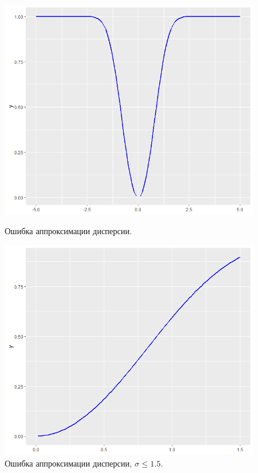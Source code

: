\documentclass[12pt]{article}
\begin{document}
\begin{figure}[h]
	\begin{center}
		\begin{minipage}[h]{0.4\linewidth}
			\includegraphics[width=1\linewidth]{ris3.png}
			\caption{Ошибка аппроксимации дисперсии.} %
			\label{ris3} %
		\end{minipage}
		\hfill
		\begin{minipage}[h]{0.4\linewidth}
			\includegraphics[width=1\linewidth]{ris4.png}
			\caption{Ошибка аппроксимации дисперсии, $\sigma\leq 1.5.$}
			\label{ris4}
		\end{minipage}
	\end{center}
\end{figure}
	
\end{document}
